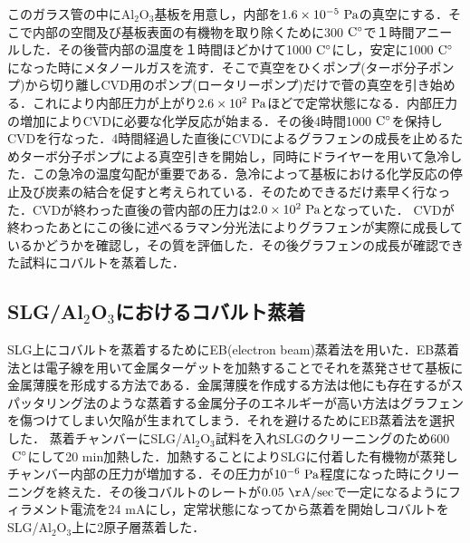 このガラス管の中にAl$_{2}$O$_{3}$基板を用意し，内部を$1.6\times10^{-5}\rm\ Pa$の真空にする．そこで内部の空間及び基板表面の有機物を取り除くために300$\rm\ C^{\circ}$で１時間アニールした．その後菅内部の温度を１時間ほどかけて1000$\rm\ C^{\circ}$にし，安定に1000$\rm\ C^{\circ}$になった時にメタノールガスを流す．そこで真空をひくポンプ(ターボ分子ポンプ)から切り離しCVD用のポンプ(ロータリーポンプ)だけで菅の真空を引き始める．これにより内部圧力が上がり$2.6\times10^{2}\rm\ Pa$ほどで定常状態になる．内部圧力の増加によりCVDに必要な化学反応が始まる．その後4時間1000$\rm\ C^{\circ}$を保持しCVDを行なった．4時間経過した直後にCVDによるグラフェンの成長を止めるためターボ分子ポンプによる真空引きを開始し，同時にドライヤーを用いて急冷した．この急冷の温度勾配が重要である．急冷によって基板における化学反応の停止及び炭素の結合を促すと考えられている．そのためできるだけ素早く行なった．CVDが終わった直後の菅内部の圧力は$2.0\times10^{2}\rm\ Pa$となっていた．
CVDが終わったあとにこの後に述べるラマン分光法によりグラフェンが実際に成長しているかどうかを確認し，その質を評価した．その後グラフェンの成長が確認できた試料にコバルトを蒸着した．

\subsection{SLG/Al$_{2}$O$_{3}$におけるコバルト蒸着}

SLG上にコバルトを蒸着するためにEB(electron beam)蒸着法を用いた．EB蒸着法とは電子線を用いて金属ターゲットを加熱することでそれを蒸発させて基板に金属薄膜を形成する方法である．金属薄膜を作成する方法は他にも存在するがスパッタリング法のような蒸着する金属分子のエネルギーが高い方法はグラフェンを傷つけてしまい欠陥が生まれてしまう．それを避けるためにEB蒸着法を選択した．
蒸着チャンバーにSLG/Al$_{2}$O$_{3}$試料を入れSLGのクリーニングのため600$\rm\ C^{\circ}$にして20 min加熱した．加熱することによりSLGに付着した有機物が蒸発しチャンバー内部の圧力が増加する．その圧力が$10^{-6}\rm\ Pa$程度になった時にクリーニングを終えた．その後コバルトのレートが$0.05\rm\ \AA/sec$で一定になるようにフィラメント電流を24 mAにし，定常状態になってから蒸着を開始しコバルトをSLG/Al$_{2}$O$_{3}$上に2原子層蒸着した．


